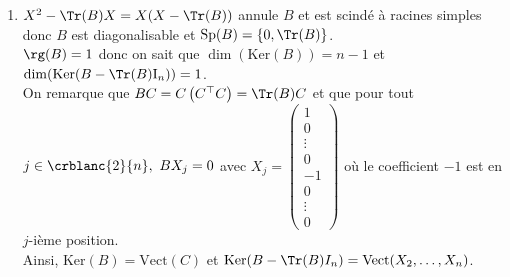\documentclass[8pt]{book}
\begin{document}
\begin{enumerate}
		Ainsi, $B^p=\Tr(B)^{p-1}B$.
		\item $X^2-\Tr(B)X=X(X-\Tr(B))$ annule $B$ et est scindé à racines simples donc $B$ est diagonalisable et $\operatorname{Sp}(B)=\{0,\Tr(B)\}$.\\
		$\rg(B)=1$ donc on sait que $\dim(\text{Ker}(B))=n-1$ et $\dim(\text{Ker}(B-\Tr(B)\text{I}_n))=1$.\\
		On remarque que $BC=C\left(C^\top C\right)=\Tr(B)C$ et que pour tout $j\in \crblanc{2}{n},\ BX_j=0$ avec $X_j=\begin{pmatrix} 1\\ 0\\ \vdots\\ 0\\ -1\\ 0\\ \vdots\\ 0\end{pmatrix}$ où le coefficient $-1$ est en $j$-ième position.\\
		Ainsi, $\text{Ker}(B)=\text{Vect}(C)$ et $\text{Ker}(B-\Tr(B)I_n)=\text{Vect}(X_2,\dots,X_n)$.
	\end{enumerate}
	
\end{document}

